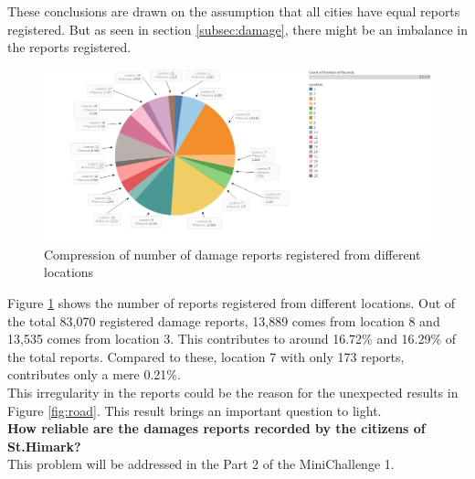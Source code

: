 \documentclass[12pt]{extarticle}
\begin{document}
These conclusions are drawn on the assumption that all cities have equal reports registered. But as seen in section \ref{subsec:damage}, there might be an imbalance in the reports registered. 

\begin{figure}[H]
\centering
	\includegraphics[width=\linewidth]{Images/RecordPercentile.png}
	\caption{Compression of number of damage reports registered from different locations}
	\label{fig:regrecords}
\end{figure}

Figure \ref{fig:regrecords} shows the number of reports registered from different locations. Out of the total 83,070 registered damage reports, 13,889 comes from location 8 and 13,535 comes from location 3. This contributes to around 16.72\% and 16.29\% of the total reports. Compared to these, location 7 with only 173 reports, contributes only a mere 0.21\%. \\

This irregularity in the reports could be the reason for the unexpected results in Figure \ref{fig:road}. This result brings an important question to light. \\

\noindent
\textbf{How reliable are the damages reports recorded by the citizens of St.Himark? } \\

\noindent
This problem will be addressed in the Part 2 of the MiniChallenge 1. 
\end{document}
